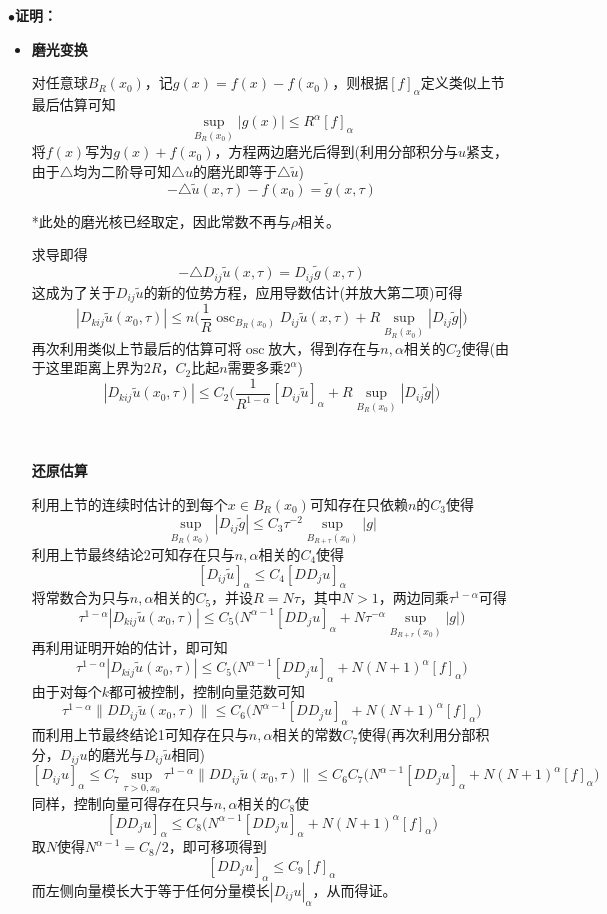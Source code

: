 \documentclass[a4paper,UTF8,fontset=windows,AutoFakeBold]{ctexart}
\DeclareMathOperator*{\osc}{osc}
\newcommand{\proo}[1]{{\kaishu $\bullet$\textbf{证明：}
\begin{itemize}
    \item[] #1
\end{itemize}
}}
\begin{document}
\proo{
    \textbf{磨光变换}

    对任意球$B_R(x_0)$，记$g(x)=f(x)-f(x_0)$，则根据$[f]_\alpha$定义类似上节最后估算可知
    $$\sup_{B_R(x_0)}|g(x)|\le R^\alpha[f]_\alpha$$
    将$f(x)$写为$g(x)+f(x_0)$，方程两边磨光后得到(利用分部积分与$u$紧支，由于$\triangle$均为二阶导可知$\triangle u$的磨光即等于$\triangle\tilde{u}$)
    $$-\triangle\tilde{u}(x,\tau)-f(x_0)=\tilde{g}(x,\tau)$$

    *此处的磨光核已经取定，因此常数不再与$\rho$相关。

    求导即得
    $$-\triangle D_{ij}\tilde{u}(x,\tau)=D_{ij}\tilde{g}(x,\tau)$$
    这成为了关于$D_{ij}\tilde{u}$的新的位势方程，应用导数估计(并放大第二项)可得
    $$|D_{kij}\tilde{u}(x_0,\tau)|\le n\bigg(\frac{1}{R}\osc_{B_R(x_0)}D_{ij}\tilde{u}(x,\tau)+R\sup_{B_R(x_0)}|D_{ij}\tilde{g}|\bigg)$$
    再次利用类似上节最后的估算可将$\osc$放大，得到存在与$n,\alpha$相关的$C_2$使得(由于这里距离上界为$2R$，$C_2$比起$n$需要多乘$2^\alpha$)
    $$|D_{kij}\tilde{u}(x_0,\tau)|\le C_2\bigg(\frac{1}{R^{1-\alpha}}[D_{ij}\tilde{u}]_\alpha+R\sup_{B_R(x_0)}|D_{ij}\tilde{g}|\bigg)$$

    \

    \textbf{还原估算}

    利用上节的连续时估计的到每个$x\in B_R(x_0)$可知存在只依赖$n$的$C_3$使得
    $$\sup_{B_R(x_0)}|D_{ij}\tilde{g}|\le C_3\tau^{-2}\sup_{B_{R+\tau}(x_0)}|g|$$
    利用上节最终结论2可知存在只与$n,\alpha$相关的$C_4$使得
    $$[D_{ij}\tilde{u}]_\alpha\le C_4[DD_ju]_\alpha$$
    将常数合为只与$n,\alpha$相关的$C_5$，并设$R=N\tau$，其中$N>1$，两边同乘$\tau^{1-\alpha}$可得
    $$\tau^{1-\alpha}|D_{kij}\tilde{u}(x_0,\tau)|\le C_5\big(N^{\alpha-1}[DD_ju]_\alpha+N\tau^{-\alpha}\sup_{B_{R+r}(x_0)}|g|\big)$$
    再利用证明开始的估计，即可知
    $$\tau^{1-\alpha}|D_{kij}\tilde{u}(x_0,\tau)|\le C_5\big(N^{\alpha-1}[DD_ju]_\alpha+N(N+1)^\alpha[f]_\alpha\big)$$
    由于对每个$k$都可被控制，控制向量范数可知
    $$\tau^{1-\alpha}\|DD_{ij}\tilde{u}(x_0,\tau)\|\le C_6\big(N^{\alpha-1}[DD_ju]_\alpha+N(N+1)^\alpha[f]_\alpha\big)$$
    而利用上节最终结论1可知存在只与$n,\alpha$相关的常数$C_7$使得(再次利用分部积分，$D_{ij}u$的磨光与$D_{ij}\tilde{u}$相同)
    $$[D_{ij}u]_\alpha\le C_7\sup_{\tau>0,x_0}\tau^{1-\alpha}\|DD_{ij}\tilde{u}(x_0,\tau)\|\le C_6C_7\big(N^{\alpha-1}[DD_ju]_\alpha+N(N+1)^\alpha[f]_\alpha\big)$$
    同样，控制向量可得存在只与$n,\alpha$相关的$C_8$使
    $$[DD_ju]_\alpha\le C_8\big(N^{\alpha-1}[DD_ju]_\alpha+N(N+1)^\alpha[f]_\alpha\big)$$
    取$N$使得$N^{\alpha-1}=C_8/2$，即可移项得到
    $$[DD_ju]_\alpha\le C_9[f]_\alpha$$
    而左侧向量模长大于等于任何分量模长$|D_{ij}u|_\alpha$，从而得证。
}
\end{document}
